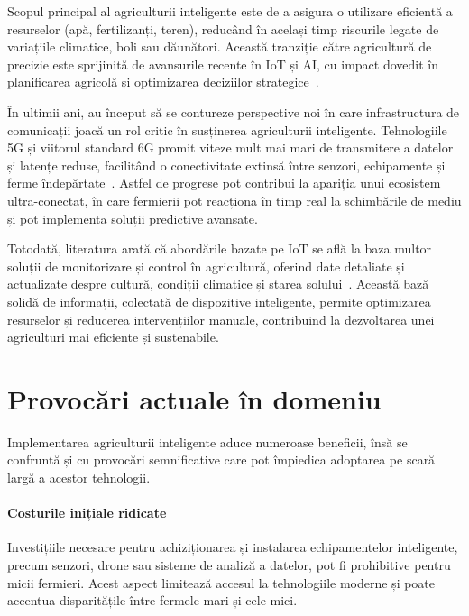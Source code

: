 \documentclass[runningheads,a4paper,11pt,twoside]{report}
\begin{document}
Scopul principal al agriculturii inteligente este de a asigura o utilizare eficientă a resurselor (apă, fertilizanți, teren), reducând în același timp riscurile legate de variațiile climatice, boli sau dăunători. Această tranziție către agricultură de precizie este sprijinită de avansurile recente în IoT și AI, cu impact dovedit în planificarea agricolă și optimizarea deciziilor strategice~\cite{wolfert2017big,liakos2018machine}.

În ultimii ani, au început să se contureze perspective noi în care infrastructura de comunicații joacă un rol critic în susținerea agriculturii inteligente. Tehnologiile 5G și viitorul standard 6G promit viteze mult mai mari de transmitere a datelor și latențe reduse, facilitând o conectivitate extinsă între senzori, echipamente și ferme îndepărtate~\cite{zhang2022_6g_agriculture}. Astfel de progrese pot contribui la apariția unui ecosistem ultra-conectat, în care fermierii pot reacționa în timp real la schimbările de mediu și pot implementa soluții predictive avansate.

Totodată, literatura arată că abordările bazate pe IoT se află la baza multor soluții de monitorizare și control în agricultură, oferind date detaliate și actualizate despre cultură, condiții climatice și starea solului~\cite{navarro2020_iot_smartfarming}. Această bază solidă de informații, colectată de dispozitive inteligente, permite optimizarea resurselor și reducerea intervențiilor manuale, contribuind la dezvoltarea unei agriculturi mai eficiente și sustenabile.

\section{Provocări actuale în domeniu}

Implementarea agriculturii inteligente aduce numeroase beneficii, însă se confruntă și cu provocări semnificative care pot împiedica adoptarea pe scară largă a acestor tehnologii.

\paragraph{Costurile inițiale ridicate} Investițiile necesare pentru achiziționarea și instalarea echipamentelor inteligente, precum senzori, drone sau sisteme de analiză a datelor, pot fi prohibitive pentru micii fermieri. Acest aspect limitează accesul la tehnologiile moderne și poate accentua disparitățile între fermele mari și cele mici.
\end{document}
